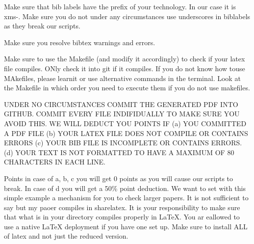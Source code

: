 Make sure that bib labels have the prefix of your technology. In our
case it is xms-. Make sure you do not under any circumstances use
underscores in biblabels as they break our scripts.

Make sure you resolve bibtex warnings and errors.

Make sure to use the Makefile (and modify it accordingly) to check if
your latex file compiles. ONly check it into git if it compiles. If
you do not know how touse MAkefiles, please learnit or use alternative
commands in the terminal. Look at the Makefile in which order you
need to execute them if you do not use makefiles. 

UNDER NO CIRCUMSTANCES COMMIT THE GENERATED PDF INTO GITHUB. COMMIT
EVERY FILE INDIFIDUALLY TO MAKE SURE YOU AVOID THIS. WE WILL
DEDUCT YOU POINTS IF (a) YOU COMMITTED A PDF FILE (b) YOUR LATEX FILE
DOES NOT COMPILE OR CONTAINS ERRORS (c) YOUR BIB FILE IS INCOMPLETE OR
CONTAINS ERRORS. (d) YOUR TEXT IS NOT FORMATTED TO HAVE A MAXIMUM OF
80 CHARACTERS IN EACH LINE. 

Points in case of a, b, c you will get 0 points as you will cause our
scripts to break. In case of d you will get a 50\% point deduction. We
want to set with this simple example a mechanism for you to check
larger papers. It is not sufficient to say but my paoer compiles in
sharelatex. It is your responsibility to make sure that what is in your
directory compiles properly in LaTeX. You ar eallowed to use a native
LaTeX deployment if you have one set up. Make sure to install ALL of
latex and not just the reduced version. 

